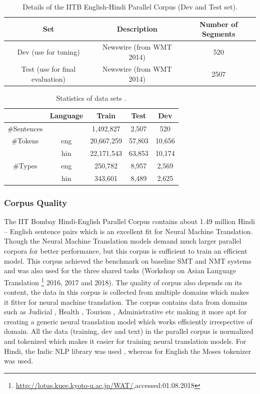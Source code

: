 \begin{table}[h!]
\centering
 \begin{tabular}{ |ccc| } 
  \hline \textbf{Set} & \textbf{Description} & \textbf{Number of Segments}  \\ 
  \hline
  Dev (use for tuning)& Newswire (from WMT 2014)&520\\
  Test (use for final evaluation)& Newswire (from WMT 2014) &2507\\
  \hline
 \end{tabular}
\caption{Details of the IITB English-Hindi Parallel Corpus (Dev and Test set)\citep{Kunchukuttan2018TheIB}.}
\end{table}

\begin{table}[h!]
\centering
 \begin{tabular}{ |ccccc| } 
  \hline &\textbf{Language} & \textbf{Train} & \textbf{Test} & \textbf{Dev} \\ 
  \hline 
  \#Sentences && 1,492,827&2,507& 520\\
  \hline
  \#Tokens& eng&20,667,259 &57,803& 10,656\\
  &hin& 22,171,543&63,853&10,174\\
  \hline
  \#Types&eng&250,782&8,957& 2,569\\
  &hin& 343,601&8,489& 2,625\\
  \hline
 \end{tabular}
\caption{Statistics of data sets \citep{Kunchukuttan2018TheIB}.}
\end{table}

\subsubsection{Corpus Quality}
The IIT Bombay Hindi-English Parallel Corpus contains about 1.49 million Hindi – English sentence pairs which is an excellent fit for Neural Machine Translation. Though the Neural Machine Translation models demand much larger parallel corpora for better performance, but this corpus  is sufficient to train an efficient model. This corpus achieved the benchmark on baseline SMT and NMT systems and was also used for the three shared tasks (Workshop on Asian Language Translation \footnote{\url{http://lotus.kuee.kyoto-u.ac.jp/WAT/},accessed:01.08.2018} 2016, 2017 and 2018). The quality of corpus also depends on its content, the data in this corpus is collected from multiple domains which makes it fitter for neural machine translation. The corpus contains data from domains such as Judicial , Health , Tourism , Administrative etc making it more apt for creating a generic neural translation model which works efficiently irrespective of domain.
All the data (training, dev and text) in the parallel corpus is normalized and tokenized which makes it easier for training neural translation models. For Hindi, the Indic NLP library\citep{Kunchukuttan2013} was used , whereas for English the Moses tokenizer was used.  

